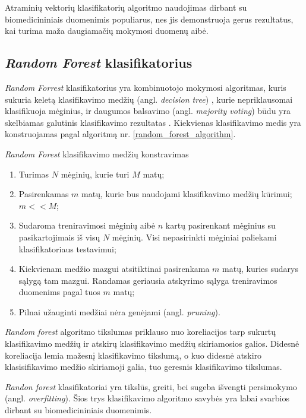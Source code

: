 Atraminių vektorių klasifikatorių algoritmo naudojimas dirbant su biomedicininiais duomenimis populiarus, nes jis demonstruoja gerus rezultatus, kai turima maža daugiamačių mokymosi duomenų aibė. 




\subsection{\textit{Random Forest} klasifikatorius}

\textit{Random Forrest} klasifikatorius yra kombinuotojo mokymosi algoritmas, kuris sukuria keletą klasifikavimo medžių (angl. \textit{decision tree}) \cite{DBLP:books/mk/HanK2000}, kurie  nepriklausomai klasifikuoja mėginius, ir daugumos balsavimo (angl. \textit{majority voting}) būdu yra skelbiamas galutinis klasifikavimo rezultatas \cite{breiman1984classification}. Kiekvienas klasifikavimo medis yra konstruojamas pagal algoritmą nr. \ref{random_forest_algorithm}.
\begin{algorithm}
 \caption{\textit{Random Forest} klasifikavimo medžių konstravimas}
 \label{random_forest_algorithm}
 \begin{enumerate}
  \item Turimas $N$ mėginių, kurie turi $M$ matų;
  \item Pasirenkamas $m$ matų, kurie bus naudojami klasifikavimo medžių kūrimui; $m << M$;
  \item Sudaroma treniravimosi mėginių aibė $n$ kartų pasirenkant mėginius su pasikartojimais iš visų $N$ mėginių. Visi nepasirinkti mėginiai paliekami klasifikatoriaus testavimui; 
  \item Kiekvienam medžio mazgui atsitiktinai pasirenkama $m$ matų, kuries sudarys sąlygą tam mazgui. Randamas geriausia atskyrimo sąlyga treniravimos duomenims pagal tuos $m$ matų;
  \item Pilnai užauginti medžiai nėra genėjami (angl. \textit{pruning}).
 \end{enumerate}
\end{algorithm}

\textit{Random forest} algoritmo tikslumas priklauso nuo koreliacijos tarp sukurtų klasifikavimo medžių ir atskirų klasifikavimo medžių skiriamosios galios. Didesnė koreliacija lemia mažesnį klasifikavimo tikslumą, o kuo didesnė atskiro klasisifikavimo medžio skiriamoji galia, tuo geresnis klasifikavimo tikslumas.

\textit{Randon forest} klasifikatoriai yra tikslūs, greiti, bei sugeba išvengti persimokymo (angl. \textit{overfitting}). Šios trys klasifikavimo algoritmo savybės yra labai svarbios dirbant su biomedicininiais duomenimis. 

